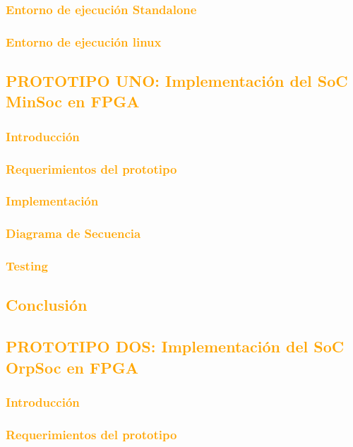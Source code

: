 \documentclass[a4paper,11pt]{article}
\begin{document}
		\subsubsection{\textcolor{orange}{Entorno de ejecución Standalone}}
		\subsubsection{\textcolor{orange}{Entorno de ejecución linux}}
	\subsection{\textcolor{orange}{PROTOTIPO UNO: Implementación del SoC MinSoc en FPGA}}
		\subsubsection{\textcolor{orange}{Introducción}}
		\subsubsection{\textcolor{orange}{Requerimientos del prototipo}}
		\subsubsection{\textcolor{orange}{Implementación}}
			\subsubsection{\textcolor{orange}{Diagrama de Secuencia}}
			\subsubsection{\textcolor{orange}{Testing}}
		\subsection{\textcolor{orange}{Conclusión}}
	\subsection{\textcolor{orange}{PROTOTIPO DOS: Implementación del SoC OrpSoc en FPGA}}
		\subsubsection{\textcolor{orange}{Introducción}}
		\subsubsection{\textcolor{orange}{Requerimientos del prototipo}}
\end{document}
